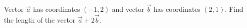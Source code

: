 Vector $\vec{a}$ has coordinates $(-1,2)$ and vector $\vec{b}$ has coordinates $(2,1)$. Find the length of the vector $\vec{a}+2\vec{b}$.

